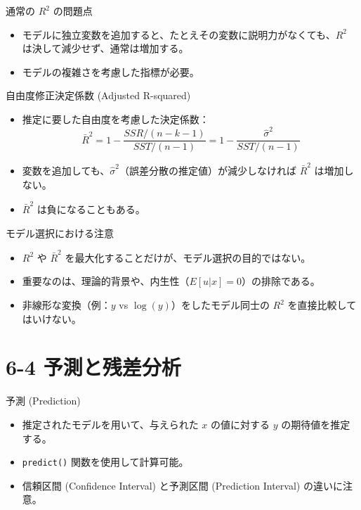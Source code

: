 \documentclass[
  ignorenonframetext,
]{beamer}
\providecommand{\tightlist}{%
  \setlength{\itemsep}{0pt}\setlength{\parskip}{0pt}}
\begin{document}
\begin{frame}{通常の \(R^2\) の問題点}
\protect\hypertarget{ux901aux5e38ux306e-r2-ux306eux554fux984cux70b9}{}
\begin{itemize}
\tightlist
\item
  モデルに独立変数を追加すると、たとえその変数に説明力がなくても、\(R^2\)
  は決して減少せず、通常は増加する。
\item
  モデルの複雑さを考慮した指標が必要。
\end{itemize}
\end{frame}

\begin{frame}{自由度修正決定係数 (Adjusted R-squared)}
\protect\hypertarget{ux81eaux7531ux5ea6ux4feeux6b63ux6c7aux5b9aux4fc2ux6570-adjusted-r-squared}{}
\begin{itemize}
\tightlist
\item
  推定に要した自由度を考慮した決定係数：
  \[ \bar{R}^2 = 1 - \frac{SSR / (n - k - 1)}{SST / (n - 1)} = 1 - \frac{\hat{\sigma}^2}{SST / (n-1)} \]
\item
  変数を追加しても、\(\hat{\sigma}^2\)（誤差分散の推定値）が減少しなければ
  \(\bar{R}^2\) は増加しない。
\item
  \(\bar{R}^2\) は負になることもある。
\end{itemize}
\end{frame}

\begin{frame}{モデル選択における注意}
\protect\hypertarget{ux30e2ux30c7ux30ebux9078ux629eux306bux304aux3051ux308bux6ce8ux610f}{}
\begin{itemize}
\tightlist
\item
  \(R^2\) や \(\bar{R}^2\)
  を最大化することだけが、モデル選択の目的ではない。
\item
  重要なのは、理論的背景や、内生性（\(E[u|x]=0\)）の排除である。
\item
  非線形な変換（例：\(y\) vs \(\log(y)\)）をしたモデル同士の \(R^2\)
  を直接比較してはいけない。
\end{itemize}
\end{frame}

\hypertarget{ux4e88ux6e2cux3068ux6b8bux5deeux5206ux6790}{%
\section{6-4
予測と残差分析}\label{ux4e88ux6e2cux3068ux6b8bux5deeux5206ux6790}}

\begin{frame}[fragile]{予測 (Prediction)}
\protect\hypertarget{ux4e88ux6e2c-prediction}{}
\begin{itemize}
\tightlist
\item
  推定されたモデルを用いて、与えられた \(x\) の値に対する \(y\)
  の期待値を推定する。
\item
  \texttt{predict()} 関数を使用して計算可能。
\item
  信頼区間 (Confidence Interval) と予測区間 (Prediction Interval)
  の違いに注意。
\end{itemize}
\end{frame}
\end{document}

